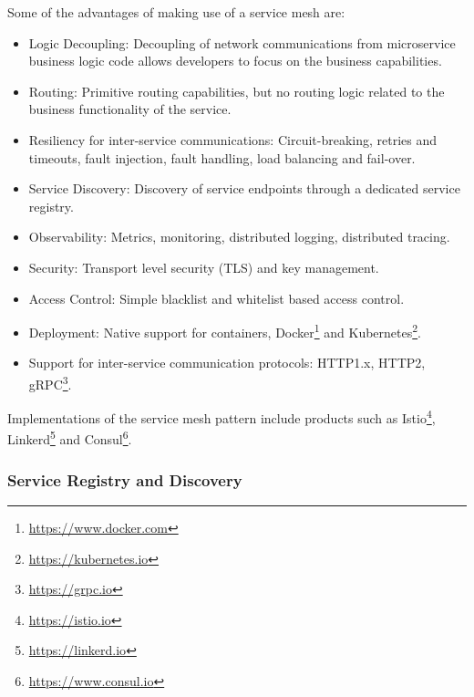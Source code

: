 \documentclass{Configuration_Files/PoliMi3i_thesis}
\begin{document}
Some of the advantages of making use of a service mesh are:

\begin{itemize}
    \item Logic Decoupling: Decoupling of network communications from microservice business logic code allows developers to focus on the business capabilities.
    
    \item Routing: Primitive routing capabilities, but no routing logic related to the business functionality of the service.
    
    \item Resiliency for inter-service communications: Circuit-breaking, retries and timeouts, fault injection, fault handling, load balancing and fail-over. 
    
    \item Service Discovery: Discovery of service endpoints through a dedicated service registry.
    
    \item Observability: Metrics, monitoring, distributed logging, distributed tracing.
    
    \item Security: Transport level security (TLS) and key management.
    
    \item Access Control: Simple blacklist and whitelist based access control.
    
    \item Deployment: Native support for containers, Docker\footnote{\href{https://www.docker.com}{https://www.docker.com}} and Kubernetes\footnote{\href{https://kubernetes.io}{https://kubernetes.io}}. 
    \item Support for inter-service communication protocols: HTTP1.x, HTTP2, gRPC\footnote{\href{https://grpc.io}{https://grpc.io}}.
\end{itemize}

Implementations of the service mesh pattern include products such as Istio\footnote{\href{https://istio.io}{https://istio.io}}, Linkerd\footnote{\href{https://linkerd.io}{https://linkerd.io}} and Consul\footnote{\href{https://www.consul.io}{https://www.consul.io}}.

\subsubsection{Service Registry and Discovery}
\label{subsubsec:srd}
\end{document}
